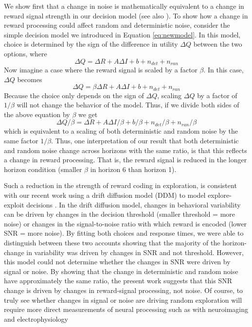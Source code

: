 \documentclass[12pt]{article}
\begin{document}
{We show first that a change in noise is mathematically equivalent to a change in reward signal strength in our decision model (see also \cite{Cinotti19}). To show how a change in reward processing could affect random and deterministic noise, consider the simple decision model we introduced in Equation \ref{eq:newmodel}. In this model, choice is determined by the sign of the difference in utility $\Delta Q$ between the two options, where
\begin{equation}
	\label{eq:noise1}
	\Delta Q = 
	\Delta R + A \Delta I + b + n_{det} + n_{ran}
\end{equation}
Now imagine a case where the reward signal is scaled by a factor $\beta$.  In this case, $\Delta Q$ becomes
\begin{equation}
	\label{eq:noise2}
	\Delta Q = 
	\beta \Delta R + A \Delta I + b + n_{det} + n_{ran}
\end{equation}
Because the choice only depends on the sign of $\Delta Q$, scaling $\Delta Q$ by a factor of $1/\beta$ will not change the behavior of the model.  Thus, if we divide both sides of the above equation by $\beta$ we get
\begin{equation}
	\label{eq:noise3}
	\Delta Q / \beta = 
	\Delta R + A \Delta I / \beta + b / \beta + n_{det} / \beta + n_{ran} / \beta
\end{equation}
which is equivalent to a scaling of both deterministic and random noise by the same factor $1/\beta$. Thus, one interpretation of our result that both deterministic and random noise change across horizons with the same ratio, is that this reflects a change in reward processing. That is, the reward signal is reduced in the longer horizon condition (smaller $\beta$ in horizon 6 than horizon 1).  %

Such a reduction in the strength of reward coding in exploration, is consistent with our recent work using a drift diffusion model (DDM) to model explore-exploit decisions \citep{Feng21}. In the drift diffusion model, changes in behavioral variability can be driven by changes in the decision threshold (smaller threshold = more noise) or changes in the signal-to-noise ratio with which reward is encoded (lower SNR = more noise). By fitting both choices and response times, we were able to distinguish between these two accounts showing that the majority of the horizon-change in variability was driven by changes in SNR and not threshold. However, this model could not determine whether the changes in SNR were driven by signal or noise. By showing that the change in deterministic and random noise have approximately the same ratio, the present work suggests that this SNR change is driven by changes in reward-signal processing, not noise. Of course, to truly see whether changes in signal or noise are driving random exploration will require more direct measurements of neural processing such as with neuroimaging and electrophysiology \citep{Tomov20, Ebitz18,costa1,costa22}



}
\end{document}
